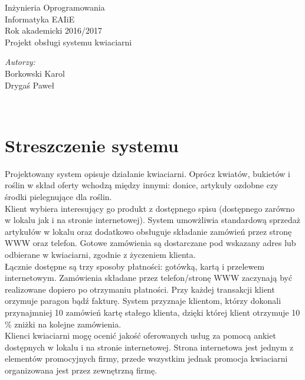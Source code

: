 \documentclass[a4paper,12pt]{article}
\begin{document}
	\begin{titlepage}
		\center 
		\Large Inżynieria Oprogramowania\\[0.5cm]
		\large Informatyka EAIiE\\
		\large Rok akademicki 2016/2017\\[5cm]
		\fontsize{40}{8}\selectfont Projekt obsługi systemu kwiaciarni\\[7.5cm]
		\begin{minipage}{1.1\textwidth}
			\begin{flushright} \Large
				\emph{Autorzy:}\\
				Borkowski Karol\\
				Drygaś Paweł
			\end{flushright}
		\end{minipage}\\[4cm]	
		\vfill		
	\end{titlepage}
	\tableofcontents
	\newpage
	\section{Streszczenie systemu}
	 Projektowany system opisuje działanie kwiaciarni. Oprócz kwiatów, bukietów i roślin w skład oferty wchodzą między innymi: donice, artykuły ozdobne czy środki pielegnujące dla roślin. \\	
	Klient wybiera interesujący go produkt z dostępnego spisu (dostępnego zarówno w lokalu jak i na stronie internetowej). System umowżliwia standardową sprzedaż artykułów w lokalu oraz dodatkowo obsługuje składanie zamówień przez stronę WWW oraz telefon. 
	Gotowe zamówienia są dostarczane pod wskazany adres lub odbierane w kwiaciarni, zgodnie z życzeniem klienta. \\ Łącznie dostępne są trzy sposoby płatności: gotówką, kartą i przelewem internetowym. Zamówienia składane przez telefon/stronę WWW zaczynają być realizowane dopiero po otrzymaniu płatności. Przy każdej transakcji klient orzymuje paragon bądź fakturę.
	System przyznaje klientom, którzy dokonali przynajmniej 10 zamówień kartę stałego klienta, dzięki której klient otrzymuje 10 \% zniżki na kolejne zamówienia.
	\\
	Klienci kwiaciarni mogę ocenić jakość oferowanych usług za pomocą ankiet dostępnych w lokalu i na stronie internetowej. Strona internetowa jest jednym z elementów promocyjnych firmy, przede wszystkim jednak promocja kwiaciarni organizowana jest przez zewnętrzną firmę.
	\newpage
\end{document}

